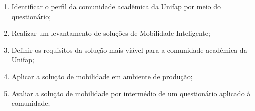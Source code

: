 \begin{enumerate}

\item Identificar o perfil da comunidade acadêmica da Unifap por meio do questionário; 


\item Realizar um levantamento de soluções de Mobilidade Inteligente;


\item Definir os requisitos da solução mais viável para a comunidade acadêmica da Unifap;




\item Aplicar a solução de mobilidade em ambiente de produção; 

\item Avaliar a solução de mobilidade por intermédio de um questionário aplicado à comunidade;

\end{enumerate}

\begin{comment}


\begin{enumerate}
\item \textit{Realizar um questionário.}
\item \textit{Analisar os resultados do questionário.}
\item \textit{Preparar o ambiente de desenvolvimento.}
\item \textit{Estudar as ferramentas que serão utilizadas no projeto.}
\item \textit{Procurar soluções similares com o objetivo de tirar ideias utéis para o projeto.}
\item \textit{Verificar soluções que já existem com a mesma proposta de caronas solidárias, reutilizar código se for de código aberto.}
\item \textit{Integrar os serviços de gestão acadêmica com a ferramenta que irá ser criada/reutilizada na proposta.}


\end{enumerate}
\end{comment}




